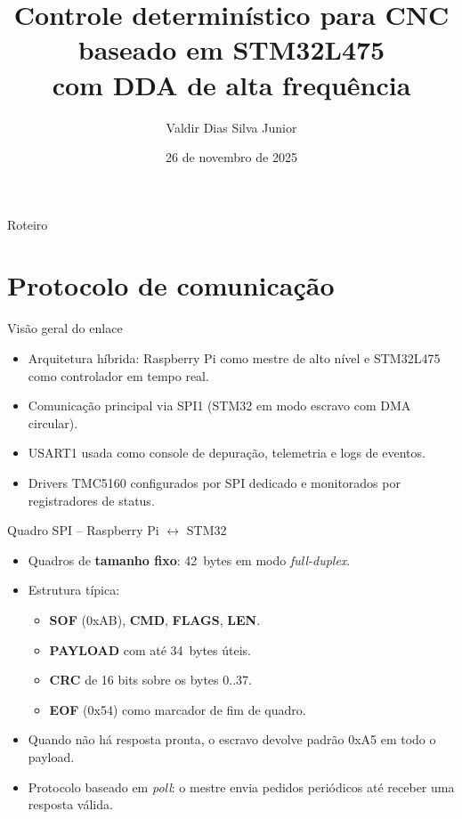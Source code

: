 \documentclass{beamer}
\title[Controle determinístico para CNC]{Controle determinístico para CNC\\[-0.3em]baseado em STM32L475\\com DDA de alta frequência}
\author[Valdir Dias Silva Junior]{Valdir Dias Silva Junior}
\institute{%
  Trabalho de Conclusão de Curso\\[0.2em]
  \small Maceió -- Alagoas
}
\date{26 de novembro de 2025}
\begin{document}
\maketitle

\begin{frame}{Roteiro}
  \tableofcontents
\end{frame}

\section{Protocolo de comunicação}

\begin{frame}{Visão geral do enlace}
  \begin{itemize}
    \item Arquitetura híbrida: Raspberry Pi como mestre de alto nível e STM32L475 como controlador em tempo real.
    \item Comunicação principal via SPI1 (STM32 em modo escravo com DMA circular).
    \item USART1 usada como console de depuração, telemetria e logs de eventos.
    \item Drivers TMC5160 configurados por SPI dedicado e monitorados por registradores de status.
  \end{itemize}
\end{frame}

\begin{frame}{Quadro SPI -- Raspberry Pi $\leftrightarrow$ STM32}
  \begin{itemize}
    \item Quadros de \textbf{tamanho fixo}: 42~bytes em modo \emph{full-duplex}.
    \item Estrutura típica:
      \begin{itemize}
        \item \textbf{SOF} (0xAB), \textbf{CMD}, \textbf{FLAGS}, \textbf{LEN}.
        \item \textbf{PAYLOAD} com até 34~bytes úteis.
        \item \textbf{CRC} de 16 bits sobre os bytes 0..37.
        \item \textbf{EOF} (0x54) como marcador de fim de quadro.
      \end{itemize}
    \item Quando não há resposta pronta, o escravo devolve padrão 0xA5 em todo o payload.
    \item Protocolo baseado em \emph{poll}: o mestre envia pedidos periódicos até receber uma resposta válida.
  \end{itemize}
\end{frame}
\end{document}
